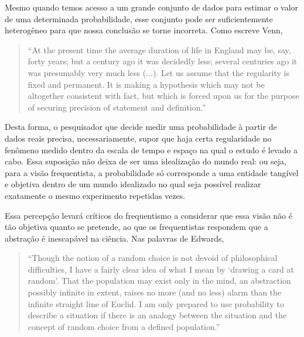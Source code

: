 Mesmo quando temos acesso a um grande conjunto de dados para estimar o valor de uma determinada
probabilidade, esse conjunto pode ser suficientemente heterogêneo para que nossa conclusão se torne incorreta. Como escreve Venn,

\begin{quote}
``At the present time the average duration of life in England may be, say, forty years; but a century ago it was decidedly less;
several centuries ago it was presumably very much less (...). Let us assume that the regularity is fixed and permanent. It is
making a hypothesis which may not be altogether consistent with fact, but which is forced upon us for the purpose of securing
precision of statement and definition.''\citep{Venn1866}
\end{quote}

Desta forma, o pesquisador que decide medir uma probabilidade à partir de dados reais precisa, 
necessariamente, supor que haja certa regularidade no fenômeno medido dentro da escala de tempo e espaço 
na qual o estudo é levado a cabo. Essa suposição não deixa de ser uma idealização do mundo real: ou seja,
para a visão frequentista, a probabilidade só corresponde a uma entidade tangível e objetiva dentro de um
mundo idealizado no qual seja possível realizar exatamente o mesmo experimento repetidas vezes.

Essa percepção levará críticos do frequentismo a considerar que essa visão não é tão objetiva quanto se
pretende, ao que os frequentistas respondem que a abstração é inescapável na ciência. Nas palavras
de Edwards,


\begin{quote}
``Though the notion of a random choice is not devoid of philosophical difficulties, I have a fairly clear 
idea of what I mean by `drawing a card at random'. That the population may exist only in the mind, an 
abstraction possibly infinite in extent, raises no more (and no less) alarm than the infinite straight line 
of Euclid. I am only prepared to use probability to describe a situation if there is an analogy between the 
situation and the concept of random choice from a defined population.''
\citep{Edwards72}
\end{quote}

